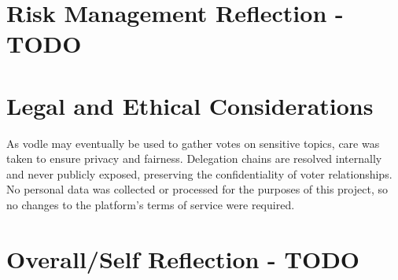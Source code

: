 \section{Risk Management Reflection - TODO}

\section{Legal and Ethical Considerations}

As vodle may eventually be used to gather votes on sensitive topics, care was taken to ensure privacy and fairness. Delegation chains are resolved internally and never publicly exposed, preserving the confidentiality of voter relationships. No personal data was collected or processed for the purposes of this project, so no changes to the platform's terms of service were required.

\section{Overall/Self Reflection - TODO}
